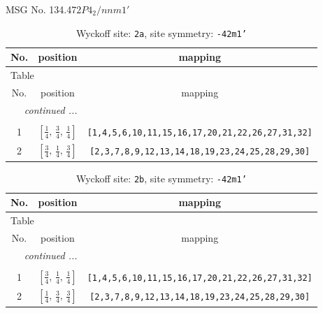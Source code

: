 \documentclass[fleqn,8pt]{jsarticle}
\begin{document}
\setcounter{MaxMatrixCols}{32}

\renewcommand{\tablename}{Table~}
\renewcommand{\figurename}{Figure~}
\begin{center}
\LARGE
MSG No. 134.472\quad$P4_{2}/nnm1'$
\end{center}
\renewcommand{\arraystretch}{1.2}
\begin{longtable}{ccc}
\caption{Wyckoff site: {\tt 2a}, site symmetry: {\tt -42m1'}}
 \\
 \hline \hline
No. & position & mapping \\ \hline \endfirsthead

\multicolumn{2}{l}{\tablename\ \thetable{}} \\
 \hline \hline
No. & position & mapping \\ \hline \endhead

 \hline \hline
\multicolumn{2}{r}{\footnotesize\it continued ...} \\ \endfoot

 \hline \hline
\multicolumn{2}{r}{} \\ \endlastfoot

1 & $\left[ \frac{1}{4},\, \frac{3}{4},\, \frac{1}{4} \right]$ & {\tt [1,4,5,6,10,11,15,16,17,20,21,22,26,27,31,32]} \\ \hline
2 & $\left[ \frac{3}{4},\, \frac{1}{4},\, \frac{3}{4} \right]$ & {\tt [2,3,7,8,9,12,13,14,18,19,23,24,25,28,29,30]} \\
\end{longtable}
\renewcommand{\arraystretch}{1.2}
\begin{longtable}{ccc}
\caption{Wyckoff site: {\tt 2b}, site symmetry: {\tt -42m1'}}
 \\
 \hline \hline
No. & position & mapping \\ \hline \endfirsthead

\multicolumn{2}{l}{\tablename\ \thetable{}} \\
 \hline \hline
No. & position & mapping \\ \hline \endhead

 \hline \hline
\multicolumn{2}{r}{\footnotesize\it continued ...} \\ \endfoot

 \hline \hline
\multicolumn{2}{r}{} \\ \endlastfoot

1 & $\left[ \frac{3}{4},\, \frac{1}{4},\, \frac{1}{4} \right]$ & {\tt [1,4,5,6,10,11,15,16,17,20,21,22,26,27,31,32]} \\ \hline
2 & $\left[ \frac{1}{4},\, \frac{3}{4},\, \frac{3}{4} \right]$ & {\tt [2,3,7,8,9,12,13,14,18,19,23,24,25,28,29,30]} \\
\end{longtable}
\end{document}
